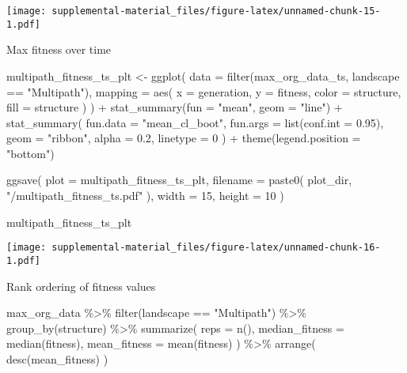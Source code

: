 \documentclass[
]{book}
\newenvironment{Shaded}{\begin{snugshade}}{\end{snugshade}}
\newcommand{\AttributeTok}[1]{\textcolor[rgb]{0.77,0.63,0.00}{#1}}
\newcommand{\DecValTok}[1]{\textcolor[rgb]{0.00,0.00,0.81}{#1}}
\newcommand{\FloatTok}[1]{\textcolor[rgb]{0.00,0.00,0.81}{#1}}
\newcommand{\FunctionTok}[1]{\textcolor[rgb]{0.00,0.00,0.00}{#1}}
\newcommand{\NormalTok}[1]{#1}
\newcommand{\OtherTok}[1]{\textcolor[rgb]{0.56,0.35,0.01}{#1}}
\newcommand{\SpecialCharTok}[1]{\textcolor[rgb]{0.00,0.00,0.00}{#1}}
\newcommand{\StringTok}[1]{\textcolor[rgb]{0.31,0.60,0.02}{#1}}
\begin{document}
\texttt{[image: supplemental-material\_files/figure-latex/unnamed-chunk-15-1.pdf]}

Max fitness over time

\begin{Shaded}
\begin{Highlighting}[]
\NormalTok{multipath\_fitness\_ts\_plt }\OtherTok{\textless{}{-}} \FunctionTok{ggplot}\NormalTok{(}
    \AttributeTok{data =} \FunctionTok{filter}\NormalTok{(max\_org\_data\_ts, landscape }\SpecialCharTok{==} \StringTok{"Multipath"}\NormalTok{),}
    \AttributeTok{mapping =} \FunctionTok{aes}\NormalTok{(}
      \AttributeTok{x =}\NormalTok{ generation,}
      \AttributeTok{y =}\NormalTok{ fitness,}
      \AttributeTok{color =}\NormalTok{ structure,}
      \AttributeTok{fill =}\NormalTok{ structure}
\NormalTok{    )}
\NormalTok{  ) }\SpecialCharTok{+}
  \FunctionTok{stat\_summary}\NormalTok{(}\AttributeTok{fun =} \StringTok{"mean"}\NormalTok{, }\AttributeTok{geom =} \StringTok{"line"}\NormalTok{) }\SpecialCharTok{+}
  \FunctionTok{stat\_summary}\NormalTok{(}
    \AttributeTok{fun.data =} \StringTok{"mean\_cl\_boot"}\NormalTok{,}
    \AttributeTok{fun.args =} \FunctionTok{list}\NormalTok{(}\AttributeTok{conf.int =} \FloatTok{0.95}\NormalTok{),}
    \AttributeTok{geom =} \StringTok{"ribbon"}\NormalTok{,}
    \AttributeTok{alpha =} \FloatTok{0.2}\NormalTok{,}
    \AttributeTok{linetype =} \DecValTok{0}
\NormalTok{  ) }\SpecialCharTok{+}
  \FunctionTok{theme}\NormalTok{(}\AttributeTok{legend.position =} \StringTok{"bottom"}\NormalTok{)}

\FunctionTok{ggsave}\NormalTok{(}
  \AttributeTok{plot =}\NormalTok{ multipath\_fitness\_ts\_plt,}
  \AttributeTok{filename =} \FunctionTok{paste0}\NormalTok{(}
\NormalTok{    plot\_dir,}
    \StringTok{"/multipath\_fitness\_ts.pdf"}
\NormalTok{  ),}
  \AttributeTok{width =} \DecValTok{15}\NormalTok{,}
  \AttributeTok{height =} \DecValTok{10}
\NormalTok{)}

\NormalTok{multipath\_fitness\_ts\_plt}
\end{Highlighting}
\end{Shaded}

\texttt{[image: supplemental-material\_files/figure-latex/unnamed-chunk-16-1.pdf]}

Rank ordering of fitness values

\begin{Shaded}
\begin{Highlighting}[]
\NormalTok{max\_org\_data }\SpecialCharTok{\%\textgreater{}\%}
  \FunctionTok{filter}\NormalTok{(landscape }\SpecialCharTok{==} \StringTok{"Multipath"}\NormalTok{) }\SpecialCharTok{\%\textgreater{}\%}
  \FunctionTok{group\_by}\NormalTok{(structure) }\SpecialCharTok{\%\textgreater{}\%}
  \FunctionTok{summarize}\NormalTok{(}
    \AttributeTok{reps =} \FunctionTok{n}\NormalTok{(),}
    \AttributeTok{median\_fitness =} \FunctionTok{median}\NormalTok{(fitness),}
    \AttributeTok{mean\_fitness =} \FunctionTok{mean}\NormalTok{(fitness)}
\NormalTok{  ) }\SpecialCharTok{\%\textgreater{}\%}
  \FunctionTok{arrange}\NormalTok{(}
    \FunctionTok{desc}\NormalTok{(mean\_fitness)}
\NormalTok{  )}
\end{Highlighting}
\end{Shaded}
\end{document}
